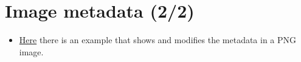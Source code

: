 \section*{Image metadata (2/2)}
\begin{itemize}
\item
  \href{https://github.com/vicente-gonzalez-ruiz/medical_imaging/blob/main/notebooks/PNG_add_metadata.ipynb}{Here}
  there is an example that shows and modifies the metadata in a PNG
  image.
\end{itemize}